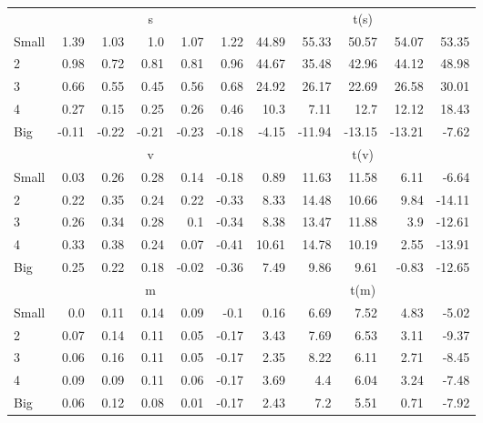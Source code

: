 \begin{table}[!ht]
\begin{tabular}{lrrrrrrrrrr}
      & \multicolumn{5}{c}{s} & \multicolumn{5}{c}{t(s)}
    
    \\
      \cmidrule(r){2-6} \cmidrule(r){7-11}

    Small   & 1.39  & 1.03  & 1.0  & 1.07  & 1.22  & 44.89  & 55.33  & 50.57  & 54.07  & 53.35  \\
         2  & 0.98  & 0.72  & 0.81  & 0.81  & 0.96  & 44.67  & 35.48  & 42.96  & 44.12  & 48.98  \\
         3  & 0.66  & 0.55  & 0.45  & 0.56  & 0.68  & 24.92  & 26.17  & 22.69  & 26.58  & 30.01  \\
         4  & 0.27  & 0.15  & 0.25  & 0.26  & 0.46  & 10.3  & 7.11  & 12.7  & 12.12  & 18.43  \\
    Big     & -0.11  & -0.22  & -0.21  & -0.23  & -0.18  & -4.15  & -11.94  & -13.15  & -13.21  & -7.62  \\

  
    
      & \multicolumn{5}{c}{v} & \multicolumn{5}{c}{t(v)}
    
    \\
      \cmidrule(r){2-6} \cmidrule(r){7-11}

    Small   & 0.03  & 0.26  & 0.28  & 0.14  & -0.18  & 0.89  & 11.63  & 11.58  & 6.11  & -6.64  \\
         2  & 0.22  & 0.35  & 0.24  & 0.22  & -0.33  & 8.33  & 14.48  & 10.66  & 9.84  & -14.11  \\
         3  & 0.26  & 0.34  & 0.28  & 0.1  & -0.34  & 8.38  & 13.47  & 11.88  & 3.9  & -12.61  \\
         4  & 0.33  & 0.38  & 0.24  & 0.07  & -0.41  & 10.61  & 14.78  & 10.19  & 2.55  & -13.91  \\
    Big     & 0.25  & 0.22  & 0.18  & -0.02  & -0.36  & 7.49  & 9.86  & 9.61  & -0.83  & -12.65  \\

  
    
      & \multicolumn{5}{c}{m} & \multicolumn{5}{c}{t(m)}
    
    \\
      \cmidrule(r){2-6} \cmidrule(r){7-11}

    Small   & 0.0  & 0.11  & 0.14  & 0.09  & -0.1  & 0.16  & 6.69  & 7.52  & 4.83  & -5.02  \\
         2  & 0.07  & 0.14  & 0.11  & 0.05  & -0.17  & 3.43  & 7.69  & 6.53  & 3.11  & -9.37  \\
         3  & 0.06  & 0.16  & 0.11  & 0.05  & -0.17  & 2.35  & 8.22  & 6.11  & 2.71  & -8.45  \\
         4  & 0.09  & 0.09  & 0.11  & 0.06  & -0.17  & 3.69  & 4.4  & 6.04  & 3.24  & -7.48  \\
    Big     & 0.06  & 0.12  & 0.08  & 0.01  & -0.17  & 2.43  & 7.2  & 5.51  & 0.71  & -7.92  \\


\end{tabular}
\end{table}
